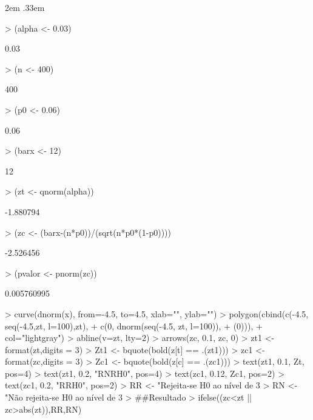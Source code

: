 \documentclass{article}
\newenvironment{ManualExercise}
  {\begin{list}{}{\leftmargin \QuestionIndent
    \partopsep0pt \parsep\parskip \topsep\QuestionBefore
    \itemsep\QuestionBefore \labelwidth2em
    \labelsep.33em
    \usecounter{Question}}}
  {\end{list}}
\begin{document}
\begin{Exercise}
\begin{ManualExercise}
\begin{Schunk}
\begin{Sinput}
> (alpha <- 0.03)
\end{Sinput}
\begin{Soutput}
[1] 0.03
\end{Soutput}
\begin{Sinput}
> (n <- 400)
\end{Sinput}
\begin{Soutput}
[1] 400
\end{Soutput}
\begin{Sinput}
> (p0 <- 0.06)
\end{Sinput}
\begin{Soutput}
[1] 0.06
\end{Soutput}
\begin{Sinput}
> (barx <- 12)
\end{Sinput}
\begin{Soutput}
[1] 12
\end{Soutput}
\begin{Sinput}
> (zt <- qnorm(alpha))
\end{Sinput}
\begin{Soutput}
[1] -1.880794
\end{Soutput}
\begin{Sinput}
> (zc <- (barx-(n*p0))/(sqrt(n*p0*(1-p0))))
\end{Sinput}
\begin{Soutput}
[1] -2.526456
\end{Soutput}
\begin{Sinput}
> (pvalor <- pnorm(zc))
\end{Sinput}
\begin{Soutput}
[1] 0.005760995
\end{Soutput}
\begin{Sinput}
> curve(dnorm(x), from=-4.5, to=4.5, xlab="", ylab="")
> polygon(cbind(c(-4.5, seq(-4.5,zt, l=100),zt),
+               c(0, dnorm(seq(-4.5, zt, l=100)),
+                 (0))),
+         col="lightgray")
> abline(v=zt, lty=2)
> arrows(zc, 0.1, zc, 0)
> zt1 <- format(zt,digits = 3)
> Zt1 <- bquote(bold(z[t] == .(zt1)))
> zc1 <- format(zc,digits = 3)
> Zc1 <- bquote(bold(z[c] == .(zc1)))
> text(zt1, 0.1, Zt, pos=4)
> text(zt1, 0.2, "RNRH0", pos=4)
> text(zc1, 0.12, Zc1, pos=2)
> text(zc1, 0.2, "RRH0", pos=2)
> RR <- "Rejeita-se H0 ao nível de 3%
> RN <- "Não rejeita-se H0 ao nível de 3%
> ##Resultado
> ifelse((zc<zt || zc>abs(zt)),RR,RN)
\end{Sinput}

\end{Schunk}
\end{ManualExercise}
\end{Exercise}
\end{document}
